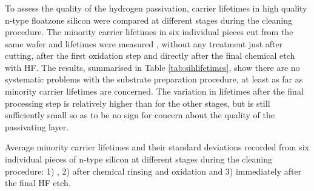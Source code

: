 \subsubsection{\sih{}}
To assess the quality of the hydrogen passivation, carrier lifetimes in high quality n-type floatzone silicon were compared at different stages during the cleaning procedure. The minority carrier lifetimes in six individual pieces cut from the same wafer and lifetimes were measured , \ie{} without any treatment just after cutting, after the first oxidation step and directly after the final chemical etch with HF. The results, summarised in Table \ref{tab:sihlifetimes}, show there are no systematic problems with the substrate preparation procedure, at least as far as minority carrier lifetimes are concerned. The variation in lifetimes after the final processing step is relatively higher than for the other stages, but is still sufficiently small so as to be no sign for concern about the quality of the passivating layer.
\begin{table}
\centering
\caption{Average minority carrier lifetimes and their standard deviations recorded from six individual pieces of n-type silicon at different stages during the cleaning procedure: 1) , 2) after chemical rinsing and oxidation and 3) immediately after the final HF etch.}
\label{tab:sihlifetimes}

\end{table}
